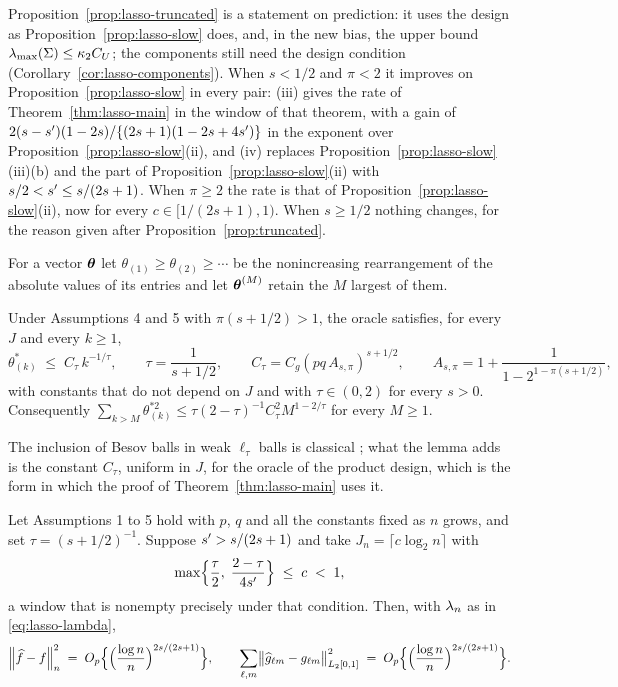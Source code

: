 Proposition~\ref{prop:lasso-truncated} is a statement on prediction: it uses
the design as Proposition~\ref{prop:lasso-slow} does, and, in the new bias,
the upper bound $\lambda_{\max}(\Sigma) \le \kappa_2C_U$; the components still need
the design condition (Corollary~\ref{cor:lasso-components}). When $s < 1/2$
and $\pi < 2$ it improves on Proposition~\ref{prop:lasso-slow} in every pair:
(iii) gives the rate of Theorem~\ref{thm:lasso-main} in the window of that
theorem, with a gain of $2(s-s')(1-2s)/\{(2s+1)(1-2s+4s')\}$ in the
exponent over Proposition~\ref{prop:lasso-slow}(ii), and (iv) replaces
Proposition~\ref{prop:lasso-slow}(iii)(b) and the part of
Proposition~\ref{prop:lasso-slow}(ii) with $s/2 < s' \le s/(2s+1)$. When
$\pi \ge 2$ the rate is that of Proposition~\ref{prop:lasso-slow}(ii), now
for every $c \in [1/(2s+1),1)$. When $s \ge 1/2$ nothing changes, for the
reason given after Proposition~\ref{prop:truncated}.

For a vector $\boldsymbol{\theta}$ let $\theta_{(1)} \ge \theta_{(2)} \ge \cdots$ be the
nonincreasing rearrangement of the absolute values of its entries and let
$\boldsymbol{\theta}^{(M)}$ retain the $M$ largest of them.

\begin{lemma}
\label{lem:lasso-weak}
Under Assumptions 4 and 5 with $\pi(s+1/2) > 1$, the oracle satisfies, for
every $J$ and every $k \ge 1$,
\[
  \theta^{*}_{(k)} \;\le\; C_\tau\,k^{-1/\tau},
  \qquad \tau = \frac{1}{s+1/2},
  \qquad C_\tau = C_g(pq\,A_{s,\pi})^{s+1/2},
  \qquad A_{s,\pi} = 1 + \frac{1}{1-2^{1-\pi(s+1/2)}},
\]
with constants that do not depend on $J$ and with $\tau \in (0,2)$ for every
$s > 0$. Consequently
$\sum_{k>M}\theta^{*2}_{(k)} \le \tau(2-\tau)^{-1}C_\tau^{2}M^{1-2/\tau}$ for
every $M \ge 1$.
\end{lemma}

The inclusion of Besov balls in weak $\ell_\tau$ balls is classical
\citep[Proposition~9.15]{johnstone2019gaussian}; what the lemma adds is the
constant $C_\tau$, uniform in $J$, for the oracle of the product design, which
is the form in which the proof of Theorem~\ref{thm:lasso-main} uses it.

\begin{theorem}
\label{thm:lasso-main}
Let Assumptions 1 to 5 hold with $p$, $q$ and all the constants fixed as $n$
grows, and set $\tau = (s+1/2)^{-1}$. Suppose $s' > s/(2s+1)$ and take
$J_n = \lceil c \log_2 n\rceil$ with
\begin{equation}
  \label{eq:lasso-window}
  \max\Bigl\{\frac{\tau}{2},\; \frac{2-\tau}{4s'}\Bigr\}
  \;\le\; c \;<\; 1 ,
\end{equation}
a window that is nonempty precisely under that condition. Then, with $\lambda_{n}$
as in \eqref{eq:lasso-lambda},
\[
  \left\lVert \widehat{f}-f \right\rVert_{n}^{2}
  \;=\; O_p\Bigl\{\Bigl(\frac{\log n}{n}\Bigr)^{2s/(2s+1)}\Bigr\},
  \qquad
  \sum_{\ell,m}\bigl\lVert \widehat{g}_{\ell m}-g_{\ell m}
  \bigr\rVert_{L_2[0,1]}^{2}
  \;=\; O_p\Bigl\{\Bigl(\frac{\log n}{n}\Bigr)^{2s/(2s+1)}\Bigr\} .
\]
\end{theorem}

